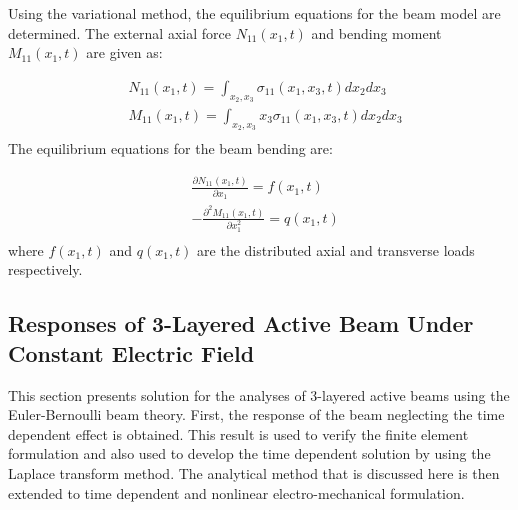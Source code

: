Using the variational method, the equilibrium equations for the beam model are determined.
The external axial force $N_{11} (x_1,t)$ and bending moment  $M_{11} (x_1,t)$ are given as:

\begin{equation}
\begin{aligned}
& N_{11} (x_1,t)=\int_{x_2,x_3}\sigma_{11} (x_1,x_3,t)dx_2 dx_3 \\
& M_{11} (x_1,t)=\int_{x_2,x_3}x_3 \sigma_{11} (x_1,x_3,t)dx_2 dx_3 \\
\end{aligned}
\label{resultant_strain_beam:EQN}
\end{equation}
The equilibrium equations for the beam bending are:

\begin{equation}
\begin{aligned}
& \frac{\partial N_{11} (x_1,t)}{\partial x_1}=f(x_1,t) \\
& -\frac{\partial^2 M_{11} (x_1,t)}{ \partial x^2_1}=q(x_1,t)\\
\end{aligned}
\label{equilibrium_resultant_strain_beam:EQN}
\end{equation}
where
$f(x_1,t)$ and $q(x_1,t)$  are  the
distributed axial and transverse loads respectively.
\\

\subsection{Responses of 3-Layered Active Beam Under Constant Electric Field}
\label{section:piezo_beam_static_elastic_solution}
This section presents solution for the analyses of 3-layered active beams using the Euler-Bernoulli beam theory.
First, the response of the beam neglecting the time dependent effect is obtained.
This result is used to verify the finite element formulation and also used to develop the time dependent solution by using the Laplace transform method.
The analytical method that is discussed here is then extended to time dependent and nonlinear electro-mechanical formulation.


